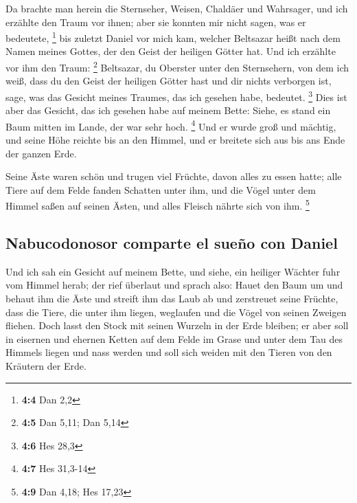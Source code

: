  Da brachte man herein die Sternseher, Weisen, Chaldäer
und Wahrsager, und ich erzählte den Traum vor ihnen; aber sie konnten
mir nicht sagen, was er bedeutete, \footnote{\textbf{4:4} Dan 2,2}
 bis zuletzt Daniel vor mich kam, welcher Beltsazar heißt
nach dem Namen meines Gottes, der den Geist der heiligen Götter hat. Und
ich erzählte vor ihm den Traum: \footnote{\textbf{4:5} Dan 5,11; Dan
  5,14}  Beltsazar, du Oberster unter den Sternsehern, von
dem ich weiß, dass du den Geist der heiligen Götter hast und dir nichts
verborgen ist, sage, was das Gesicht meines Traumes, das ich gesehen
habe, bedeutet. \footnote{\textbf{4:6} Hes 28,3}  Dies ist
aber das Gesicht, das ich gesehen habe auf meinem Bette: Siehe, es stand
ein Baum mitten im Lande, der war sehr hoch. \footnote{\textbf{4:7} Hes
  31,3-14}  Und er wurde groß und mächtig, und seine Höhe
reichte bis an den Himmel, und er breitete sich aus bis ans Ende der
ganzen Erde.

 Seine Äste waren schön und trugen viel Früchte, davon
alles zu essen hatte; alle Tiere auf dem Felde fanden Schatten unter
ihm, und die Vögel unter dem Himmel saßen auf seinen Ästen, und alles
Fleisch nährte sich von ihm. \footnote{\textbf{4:9} Dan 4,18; Hes 17,23}

\hypertarget{nabucodonosor-comparte-el-sueuxf1o-con-daniel}{%
\subsection{Nabucodonosor comparte el sueño con
Daniel}\label{nabucodonosor-comparte-el-sueuxf1o-con-daniel}}

 Und ich sah ein Gesicht auf meinem Bette, und siehe, ein
heiliger Wächter fuhr vom Himmel herab;  der rief
überlaut und sprach also: Hauet den Baum um und behaut ihm die Äste und
streift ihm das Laub ab und zerstreuet seine Früchte, dass die Tiere,
die unter ihm liegen, weglaufen und die Vögel von seinen Zweigen
fliehen.  Doch lasst den Stock mit seinen Wurzeln in der
Erde bleiben; er aber soll in eisernen und ehernen Ketten auf dem Felde
im Grase und unter dem Tau des Himmels liegen und nass werden und soll
sich weiden mit den Tieren von den Kräutern der Erde.

